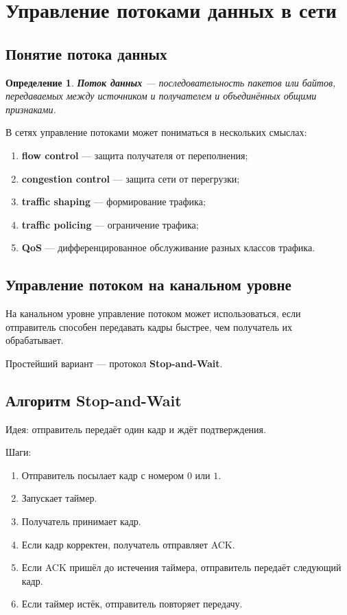 \documentclass[12pt,a4paper]{article}
\newtheorem{definition}{Определение}
\begin{document}
\section{Управление потоками данных в сети}

\subsection{Понятие потока данных}

\begin{definition}
\textbf{Поток данных} --- последовательность пакетов или байтов, передаваемых между источником и получателем и объединённых общими признаками.
\end{definition}

В сетях управление потоками может пониматься в нескольких смыслах:
\begin{enumerate}
    \item \textbf{flow control} --- защита получателя от переполнения;
    \item \textbf{congestion control} --- защита сети от перегрузки;
    \item \textbf{traffic shaping} --- формирование трафика;
    \item \textbf{traffic policing} --- ограничение трафика;
    \item \textbf{QoS} --- дифференцированное обслуживание разных классов трафика.
\end{enumerate}

\subsection{Управление потоком на канальном уровне}

На канальном уровне управление потоком может использоваться, если отправитель способен передавать кадры быстрее, чем получатель их обрабатывает.

Простейший вариант --- протокол \textbf{Stop-and-Wait}.

\subsection{Алгоритм Stop-and-Wait}

Идея: отправитель передаёт один кадр и ждёт подтверждения.

Шаги:
\begin{enumerate}
    \item Отправитель посылает кадр с номером $0$ или $1$.
    \item Запускает таймер.
    \item Получатель принимает кадр.
    \item Если кадр корректен, получатель отправляет ACK.
    \item Если ACK пришёл до истечения таймера, отправитель передаёт следующий кадр.
    \item Если таймер истёк, отправитель повторяет передачу.
\end{enumerate}
\end{document}
